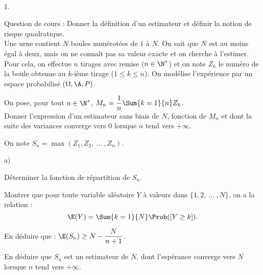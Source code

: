 \documentclass[11pt]{article}%
\begin{document}


\begin{exerciceAP}~
  \begin{noliste}{1.}
    \setlength{\itemsep}{2mm}
  \item Question de cours : Donner la définition d'un estimateur et
    définir la notion de risque quadratique.\\[.2cm]
    Une urne contient $N$ boules numérotées de $1$ à $N$. On sait que
    $N$ est au moins égal à deux, mais on ne connaît pas sa valeur
    exacte et on cherche à l'estimer. Pour cela, on effectue $n$ tirages
    avec remise ($n \in \N^*$) et on note $Z_k$ le numéro de la
    boule obtenue au $k$-ième tirage ($1 \leq k \leq n$). On modélise
    l'expérience par un espace probabilisé ($\Omega , \A , P)$.
  \item On pose, pour tout $n \in \N^*$, $M_n = \dfrac{1}{n}
    \Sum{k=1}{n} Z_k$. \\
    Donner l'expression d'un estimateur sans biais de $N$, fonction de
    $M_n$ et dont la suite des variances converge vers 0 lorsque $n$
    tend vers $+\infty$.
  \item On note $S_n = \max ( Z_1 , Z_2 ,\ \dots\ , Z_n)$.
    \begin{noliste}{a)}
      \setlength{\itemsep}{2mm}
    \item Déterminer la fonction de répartition de $S_n$.
    \item Montrer que pour toute variable aléatoire $Y$ à valeurs dans
      $\{ 1 , 2,\ \dots\ , N \}$, on a la relation :
      \[
      \E(Y) = \Sum{k=1}{N} \Prob( [ Y \geq k ]). 
      \]
    \item En déduire que : $\E( S_n) \geq N - \dfrac{N}{n+1}$.
    \item En déduire que $S_n$ est un estimateur de $N$, dont
      l'espérance converge vers $N$ lorsque $n$ tend vers $+\infty$.
    \end{noliste}
  \end{noliste}
\end{exerciceAP}
\end{document}
